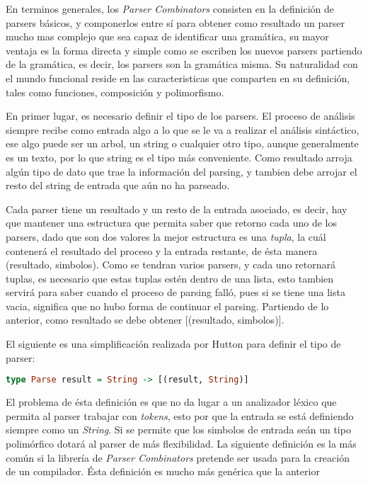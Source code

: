 En terminos generales, los \emph{Parser Combinators} consisten en la definición de parsers básicos, y componerlos entre sí para obtener como resultado un parser mucho mas complejo que sea capaz de identificar una gramática, su mayor ventaja es la forma directa y simple como se escriben los nuevos parsers partiendo de la gramática, es decir, los parsers son la gramática misma. Su naturalidad con el mundo funcional reside en las caracteristicas que comparten en su definición, tales como funciones, composición y polimorfismo.

En primer lugar, es necesario definir el tipo de los parsers. El proceso de análisis siempre recibe como entrada algo a lo que se le va a realizar el análisis sintáctico, ese algo puede ser un arbol, un string o cualquier otro tipo, aunque generalmente es un texto, por lo que string es el tipo más conveniente. Como resultado arroja algún tipo de dato que trae la información del parsing, y tambien debe arrojar el resto del string de entrada que aún no ha parseado.

Cada parser tiene un resultado y un resto de la entrada asociado, es decir, hay que mantener una estructura que permita saber que retorno cada uno de los parsers, dado que son dos valores la mejor estructura es una \emph{tupla}, la cuál contenerá el resultado del proceso y la entrada restante, de ésta manera (resultado, simbolos). Como se tendran varios parsers, y cada uno retornará tuplas, es necesario que estas tuplas estén dentro de una lista, esto tambien servirá para saber cuando el proceso de parsing falló, pues si se tiene una lista vacia, significa que no hubo forma de continuar el parsing. Partiendo de lo anterior, como resultado se debe obtener [(resultado, simbolos)].

El siguiente es una simplificación realizada por Hutton para definir el tipo de parser: \cite{Hutton1996}
\begin{lstlisting}[language=Haskell]
type Parse result = String -> [(result, String)]
\end{lstlisting}

El problema de ésta definición es que no da lugar a un analizador léxico que permita al parser trabajar con \emph{tokens}, esto por que la entrada se está definiendo siempre como un \emph{String}. Si se permite que los simbolos de entrada seán un tipo polimórfico dotará al parser de más flexibilidad. La siguiente definición es la más común si la librería de \emph{Parser Combinators} pretende ser usada para la creación de un compilador. Ésta definición es mucho más genérica que la anterior \cite{Jeuring2010}

